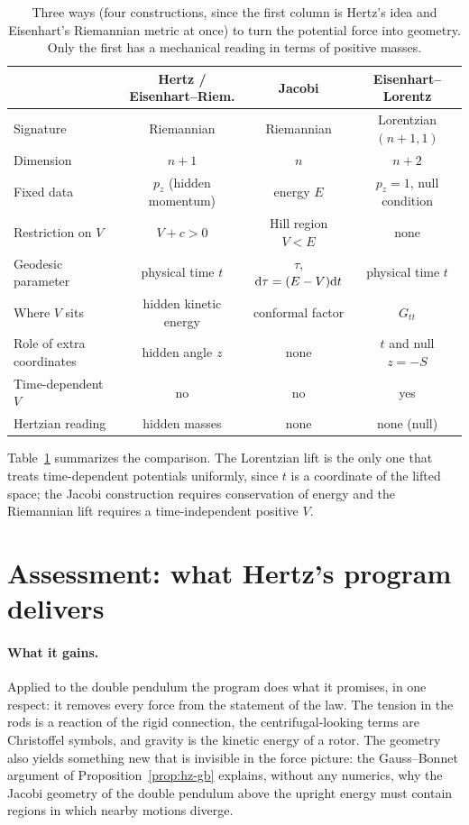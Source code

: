 \begin{table}[t]
\centering
\small
\setlength{\tabcolsep}{4pt}
\begin{tabular}{@{}lccc@{}}
\toprule
 & Hertz / Eisenhart--Riem. & Jacobi & Eisenhart--Lorentz\\
\midrule
Signature & Riemannian & Riemannian & Lorentzian $(n{+}1,1)$\\
Dimension & $n+1$ & $n$ & $n+2$\\
Fixed data & $p_z$ (hidden momentum) & energy $E$ & $p_z=1$, null condition\\
Restriction on $V$ & $V+c>0$ & Hill region $V<E$ & none\\
Geodesic parameter & physical time $t$ & $\tau$, $\mathrm{d}\tau=(E-V)\mathrm{d} t$ & physical time $t$\\
Where $V$ sits & hidden kinetic energy & conformal factor & $G_{tt}$\\
Role of extra coordinates & hidden angle $z$ & none & $t$ and null $z=-S$\\
Time-dependent $V$ & no & no & yes\\
Hertzian reading & hidden masses & none & none (null)\\
\bottomrule
\end{tabular}
\caption{Three ways (four constructions, since the first column is Hertz's idea and Eisenhart's
Riemannian metric at once) to turn the potential force into geometry. Only the first has a
mechanical reading in terms of positive masses.}
\label{tab:hz-compare}
\end{table}

Table~\ref{tab:hz-compare} summarizes the comparison. The Lorentzian lift is the only one that
treats time-dependent potentials uniformly, since $t$ is a coordinate of the lifted
space; the Jacobi construction requires conservation of energy and the Riemannian lift
requires a time-independent positive $V$.

\section{Assessment: what Hertz's program delivers}
\label{sec:hz-assess}

\paragraph{What it gains.}
Applied to the double pendulum the program does what it promises, in one
respect: it removes every force from the statement of the law. The tension in
the rods is a reaction of the rigid connection, the centrifugal-looking terms
are Christoffel symbols, and gravity is the kinetic energy of a rotor. The
geometry also yields something new that is invisible in the force picture:
the Gauss--Bonnet argument of Proposition~\ref{prop:hz-gb} explains, without any
numerics, why the Jacobi geometry of the double pendulum above the upright
energy must contain regions in which nearby motions diverge.

